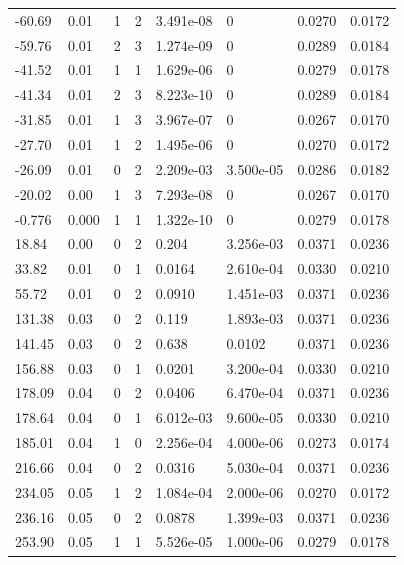 \documentclass[preview]{standalone}
\begin{document}
{{\begin{tabular}{L{1.2cm}C{1.2cm} C{0.3cm}C{0.5cm} C{1.4cm}C{1.4cm} C{1.4cm}C{1.4cm}}
  -60.69  &  0.01  & 1     &  2 &  3.491e-08  & 0  & 0.0270 &  0.0172   \\ 
  -59.76  &  0.01  & 2     &  3 &  1.274e-09  & 0  & 0.0289 &  0.0184   \\ 
  -41.52  &  0.01  & 1     &  1 &  1.629e-06  & 0  & 0.0279 &  0.0178   \\ 
  -41.34  &  0.01  & 2     &  3 &  8.223e-10  & 0  & 0.0289 &  0.0184   \\ 
  -31.85  &  0.01  & 1     &  3 &  3.967e-07  & 0  & 0.0267 &  0.0170   \\ 
  -27.70  &  0.01  & 1     &  2 &  1.495e-06  & 0  & 0.0270 &  0.0172   \\ 
  -26.09  &  0.01  & 0     &  2 &  2.209e-03  & 3.500e-05  & 0.0286 &  0.0182   \\ 
  -20.02  &  0.00  & 1     &  3 &  7.293e-08  & 0  & 0.0267 &  0.0170   \\ 
  -0.776  &  0.000  & 1     &  1 &  1.322e-10  & 0  & 0.0279 &  0.0178   \\ 
  18.84  &  0.00  & 0     &  2 &  0.204  & 3.256e-03  & 0.0371 &  0.0236   \\ 
  33.82  &  0.01  & 0     &  1 &  0.0164  & 2.610e-04  & 0.0330 &  0.0210   \\ 
  55.72  &  0.01  & 0     &  2 &  0.0910  & 1.451e-03  & 0.0371 &  0.0236   \\ 
  131.38  &  0.03  & 0     &  2 &  0.119  & 1.893e-03  & 0.0371 &  0.0236   \\ 
  141.45  &  0.03  & 0     &  2 &  0.638  & 0.0102  & 0.0371 &  0.0236   \\ 
  156.88  &  0.03  & 0     &  1 &  0.0201  & 3.200e-04  & 0.0330 &  0.0210   \\ 
  178.09  &  0.04  & 0     &  2 &  0.0406  & 6.470e-04  & 0.0371 &  0.0236   \\ 
  178.64  &  0.04  & 0     &  1 &  6.012e-03  & 9.600e-05  & 0.0330 &  0.0210   \\ 
  185.01  &  0.04  & 1     &  0 &  2.256e-04  & 4.000e-06  & 0.0273 &  0.0174   \\ 
  216.66  &  0.04  & 0     &  2 &  0.0316  & 5.030e-04  & 0.0371 &  0.0236   \\ 
  234.05  &  0.05  & 1     &  2 &  1.084e-04  & 2.000e-06  & 0.0270 &  0.0172   \\ 
  236.16  &  0.05  & 0     &  2 &  0.0878  & 1.399e-03  & 0.0371 &  0.0236   \\ 
  253.90  &  0.05  & 1     &  1 &  5.526e-05  & 1.000e-06  & 0.0279 &  0.0178   \\ 

\end{tabular}}}
\end{document}
